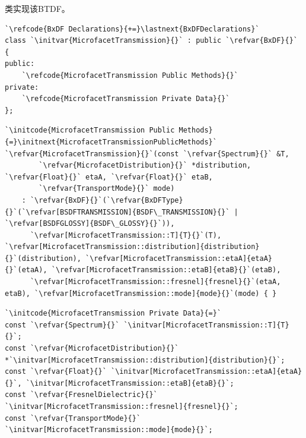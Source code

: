类实现该BTDF。
\begin{lstlisting}
`\refcode{BxDF Declarations}{+=}\lastnext{BxDFDeclarations}`
class `\initvar{MicrofacetTransmission}{}` : public `\refvar{BxDF}{}` {
public:
    `\refcode{MicrofacetTransmission Public Methods}{}`
private:
    `\refcode{MicrofacetTransmission Private Data}{}`
};
\end{lstlisting}
\begin{lstlisting}
`\initcode{MicrofacetTransmission Public Methods}{=}\initnext{MicrofacetTransmissionPublicMethods}`
`\refvar{MicrofacetTransmission}{}`(const `\refvar{Spectrum}{}` &T,
        `\refvar{MicrofacetDistribution}{}` *distribution, `\refvar{Float}{}` etaA, `\refvar{Float}{}` etaB,
        `\refvar{TransportMode}{}` mode)
    : `\refvar{BxDF}{}`(`\refvar{BxDFType}{}`(`\refvar[BSDFTRANSMISSION]{BSDF\_TRANSMISSION}{}` | `\refvar[BSDFGLOSSY]{BSDF\_GLOSSY}{}`)),
      `\refvar[MicrofacetTransmission::T]{T}{}`(T), `\refvar[MicrofacetTransmission::distribution]{distribution}{}`(distribution), `\refvar[MicrofacetTransmission::etaA]{etaA}{}`(etaA), `\refvar[MicrofacetTransmission::etaB]{etaB}{}`(etaB),
      `\refvar[MicrofacetTransmission::fresnel]{fresnel}{}`(etaA, etaB), `\refvar[MicrofacetTransmission::mode]{mode}{}`(mode) { }
\end{lstlisting}
\begin{lstlisting}
`\initcode{MicrofacetTransmission Private Data}{=}`
const `\refvar{Spectrum}{}` `\initvar[MicrofacetTransmission::T]{T}{}`;
const `\refvar{MicrofacetDistribution}{}` *`\initvar[MicrofacetTransmission::distribution]{distribution}{}`;
const `\refvar{Float}{}` `\initvar[MicrofacetTransmission::etaA]{etaA}{}`, `\initvar[MicrofacetTransmission::etaB]{etaB}{}`;
const `\refvar{FresnelDielectric}{}` `\initvar[MicrofacetTransmission::fresnel]{fresnel}{}`;
const `\refvar{TransportMode}{}` `\initvar[MicrofacetTransmission::mode]{mode}{}`;
\end{lstlisting}

